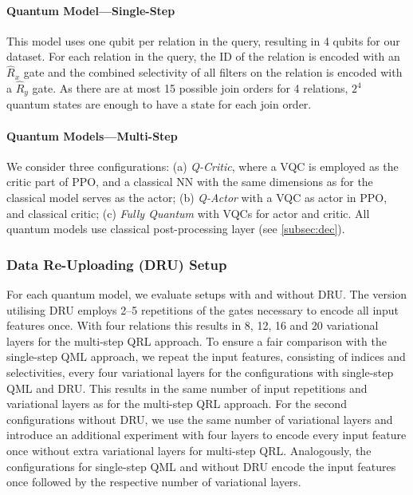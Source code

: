 \documentclass[10pt, conference]{IEEEtran}
\begin{document}
\paragraph{Quantum Model---Single-Step~\cite{winker23}}
This model uses one qubit per relation in the query, resulting in 4 qubits for our dataset. For each relation in the query, the ID of the relation is encoded with an $\hat{R}_x$ gate and the combined selectivity of all filters on the relation is encoded with a $\hat{R}_y$ gate. As there are at most 15 possible join orders for 4 relations, $2^4$ quantum states are enough to have a state for each join order.

\paragraph{Quantum Models---Multi-Step}
We consider three configurations: (a)
\emph{Q-Critic}, where a VQC is employed as the critic part of PPO,
and a classical NN with the same dimensions as for the classical 
model serves as the actor; (b) \emph{Q-Actor} with a VQC
as actor in PPO, and classical critic; (c) \emph{Fully Quantum}
with VQCs for actor and critic. All quantum models use classical post-processing layer (see \autoref{subsec:dec}).

\subsubsection{Data Re-Uploading (DRU) Setup}

For each quantum model, we evaluate setups with and without DRU.
The version utilising DRU employs 2--5 repetitions of the gates necessary to encode all input features once.
With four relations this results in 8, 12, 16 and 20 variational layers for the multi-step QRL approach.
To ensure a fair comparison with the single-step QML approach, we repeat the input features, consisting of indices and selectivities, every four variational layers for the configurations with single-step QML and DRU.
This results in the same number of input repetitions and variational layers as for the multi-step QRL approach.
For the second configurations without DRU, we use the same number of variational layers and introduce an additional experiment with four layers to encode every input feature once without extra variational layers for multi-step QRL.
Analogously, the configurations for single-step QML and without DRU encode the input features once followed by the respective number of variational layers.
\end{document}
